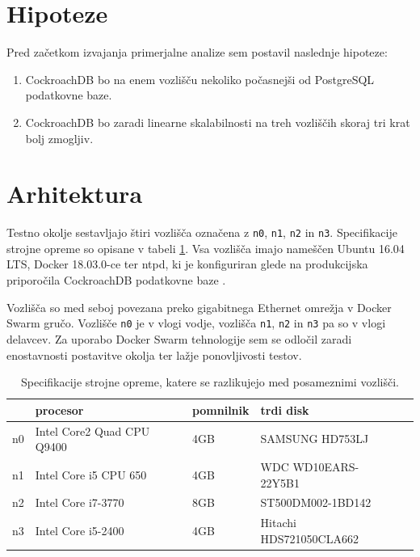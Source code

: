 \documentclass[a4paper, 12pt]{book}
\begin{document}
\section{Hipoteze}
Pred začetkom izvajanja primerjalne analize sem postavil naslednje hipoteze:
\begin{enumerate}
    \item CockroachDB bo na enem vozlišču nekoliko počasnejši od PostgreSQL podatkovne baze.

    \item CockroachDB bo zaradi linearne skalabilnosti na treh vozliščih skoraj tri krat bolj zmogljiv.
\end{enumerate}

\section{Arhitektura}
Testno okolje sestavljajo štiri vozlišča označena z \texttt{n0}, \texttt{n1}, \texttt{n2} in \texttt{n3}. Specifikacije strojne opreme so opisane v tabeli \ref{tbl_benchmarking_nodes_hw}. Vsa vozlišča imajo nameščen Ubuntu 16.04 LTS, Docker 18.03.0-ce ter ntpd, ki je konfiguriran glede na produkcijska priporočila  CockroachDB podatkovne baze \cite{CRDB-ntpd-configuration}.

Vozlišča so med seboj povezana preko gigabitnega Ethernet omrežja v Docker Swarm \cite{Docker-Swarm-Mode} gručo. Vozlišče \texttt{n0} je v vlogi vodje, vozlišča \texttt{n1}, \texttt{n2} in \texttt{n3} pa so v vlogi delavcev. Za uporabo Docker Swarm tehnologije sem se odločil zaradi enostavnosti postavitve okolja ter lažje ponovljivosti testov.

\begin{table}[H]
\begin{center}
\begin{tabular}{ |l|l|l|l|l| } 
\hline
 & \textbf{procesor} & \textbf{pomnilnik} & \textbf{trdi disk} \\
\hline
n0 & Intel Core2 Quad CPU Q9400 & 4GB & SAMSUNG HD753LJ \\
n1 & Intel Core i5 CPU 650 & 4GB & WDC WD10EARS-22Y5B1 \\ 
n2 & Intel Core i7-3770 & 8GB & ST500DM002-1BD142 \\ 
n3 & Intel Core i5-2400 & 4GB & Hitachi HDS721050CLA662 \\
\hline
\end{tabular}
\end{center}
\caption{Specifikacije strojne opreme, katere se razlikujejo med posameznimi vozlišči.}
\label{tbl_benchmarking_nodes_hw}
\end{table}
\end{document}
